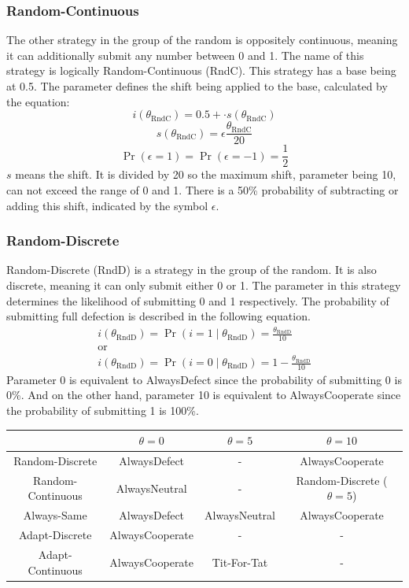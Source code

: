 \documentclass[11pt]{article}
\begin{document}
\subsubsection*{Random-Continuous}
The other strategy in the group of the random is oppositely continuous, meaning it can additionally submit any number between 0 and 1.
The name of this strategy is logically Random-Continuous (RndC).
This strategy has a base being at 0.5.
The parameter defines the shift being applied to the base, calculated by the equation:
$$i(\theta_{\mathrm{RndC}}) = 0.5 + \cdot s(\theta_{\mathrm{RndC}})$$
$$s(\theta_{\mathrm{RndC}}) = \epsilon \frac{\theta_{\mathrm{RndC}}}{20}$$
$$\Pr(\epsilon = 1) = \Pr(\epsilon = -1) = \frac{1}{2}$$
$s$ means the shift.
It is divided by 20 so the maximum shift, parameter being 10, can not exceed the range of 0 and 1.
There is a 50\% probability of subtracting or adding this shift, indicated by the symbol $\epsilon$.\\

\subsubsection*{Random-Discrete}
Random-Discrete (RndD) is a strategy in the group of the random.
It is also discrete, meaning it can only submit either 0 or 1.
The parameter in this strategy determines the likelihood of submitting 0 and 1 respectively.
The probability of submitting full defection is described in the following equation.
$$
\begin{array}{c}
i(\theta_{\mathrm{RndD}}) = \Pr(i = 1 \mid \theta_{\mathrm{RndD}}) = \frac{\theta_{\mathrm{RndD}}}{10}\\
\mathrm{or}\\
i(\theta_{\mathrm{RndD}}) = \Pr(i = 0 \mid \theta_{\mathrm{RndD}}) = 1 - \frac{\theta_{\mathrm{RndD}}}{10}
\end{array}
$$
Parameter 0 is equivalent to AlwaysDefect since the probability of submitting 0 is 0\%.
And on the other hand, parameter 10 is equivalent to AlwaysCooperate since the probability of submitting 1 is 100\%.\\

\begin{center}
\begin{tabular}{ c|c|c|c }
   & $\theta = 0$ & $\theta = 5$ & $\theta = 10$ \\ 
   \hline
	Random-Discrete & AlwaysDefect & - & AlwaysCooperate \\  
   \hline
	Random-Continuous & AlwaysNeutral & - & Random-Discrete ($\theta = 5$) \\
   \hline
	Always-Same & AlwaysDefect & AlwaysNeutral & AlwaysCooperate \\
   \hline
	Adapt-Discrete & AlwaysCooperate & - & -\\
   \hline
	Adapt-Continuous & AlwaysCooperate & Tit-For-Tat & -
\end{tabular}
\end{center}
\end{document}

